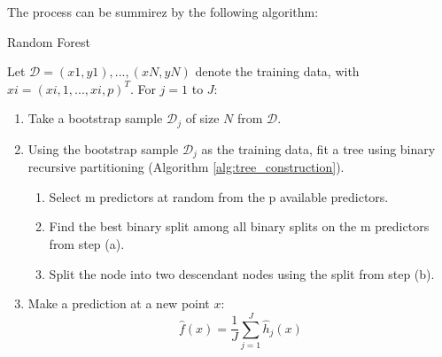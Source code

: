 The process can be summirez by the following algorithm:
\begin{tcolorbox}[colback=blue!5, colframe=blue!80, boxrule=0pt]
    \begin{algorithm} [H]
        \caption{Random Forest}
        \label{alg:random_forest}
        Let $\mathscr{D} = {(x1, y1),...,(xN, yN)}$ denote the training data, with $xi = (xi,1,..., xi,p)^T$. 
        For $j = 1$ to $J$:
        \begin{enumerate}
            \item Take a bootstrap sample $\mathscr{D}_j$ of size $N$ from $\mathscr{D}$.
            \item Using the bootstrap sample $\mathscr{D}_j$ as the training data, fit a tree using binary recursive partitioning (Algorithm \ref{alg:tree_construction}).
            \begin{enumerate}
                \item Select m predictors at random from the p available predictors.
                \item Find the best binary split among all binary splits on the m predictors from step (a).
                \item Split the node into two descendant nodes using the split from step (b).
            \end{enumerate}
            \item Make a prediction at a new point $x$: 
            \[
                \hat{f}(x) = \frac{1}{J} \sum_{j=1}^{J} \hat{h}_j(x)
            \]
        \end{enumerate}
    \end{algorithm}
\end{tcolorbox}


